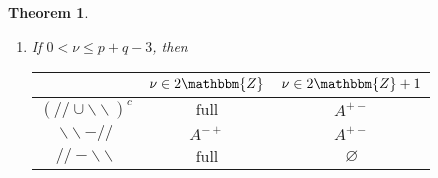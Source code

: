 \documentclass[12pt]{msjproc} %
\newcommand{\tmop}[1]{\ensuremath{\operatorname{#1}}}
\newtheorem{theorem}{Theorem}
\theoremstyle{definition}
\theoremstyle{exampstyle} \newtheorem{examp}[theorem]{Theorem}
\begin{document}
\begin{versiona}
\begin{theorem}
\begin{enumerate}
\begin{enumerate}
      \begin{center}
        \begin{center}
          \begin{center}
            \begin{center}
              \begin{tabular}{|c|c|c|}
                \hline
                & $\nu \in 2\mathbbm{Z}$ & $\nu \in 2\mathbbm{Z}+ 1$\\
                \hline
                $(/ / \cup \backslash\backslash)^c$ & $A^{\noplus + +}$ &
                $A^{+ -}$\\
                \hline
                $\backslash\backslash - / /$ & $A^{\noplus + +}$ & $A^{+ -}$\\
                \hline
                $/ / -\backslash\backslash$ & $\varnothing$ & $\varnothing$\\
                \hline
              \end{tabular}
            \end{center}
          \end{center}
        \end{center}
      \end{center}
      
      \item If $0 < \nu \leqslant p + q - 3$, then
      
      \begin{center}
        \begin{center}
          \begin{center}
            \begin{center}
              \begin{tabular}{|c|c|c|}
                \hline
                & $\nu \in 2\mathbbm{Z}$ & $\nu \in 2\mathbbm{Z}+ 1$\\
                \hline
                $(/ / \cup \backslash\backslash)^c$ & $\tmop{full}$ & $A^{+
                -}$\\
                \hline
                $\backslash\backslash - / /$ & $A^{- +}$ & $A^{+ -}$\\
                \hline
                $/ / -\backslash\backslash$ & $\tmop{full}$ & $\varnothing$\\
                \hline
              \end{tabular}
            \end{center}
          \end{center}
        \end{center}
      \end{center}
      

\end{enumerate}
\end{enumerate}
\end{theorem}
\end{versiona}
\end{document}

